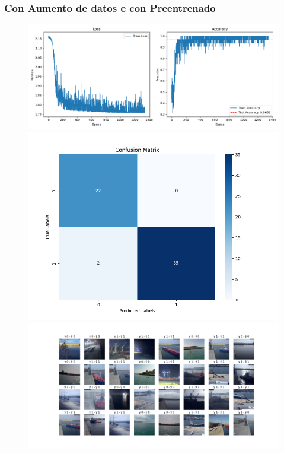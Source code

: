 \documentclass{article}
\begin{document}
\begin{figure}[H]
\begin{minipage}{0.7\textwidth}
    \end{minipage}
\end{figure}
\subsubsection{Con Aumento de datos e con Preentrenado}
\begin{figure}[H]
    \centering
    \begin{minipage}{0.55\textwidth}
        \centering
        \includegraphics[width=\linewidth]{../figures/LOSS__A_True_P_True_D_False_MLP_True_efficientnet_b4.png}
    \end{minipage}
    \begin{minipage}{0.3\textwidth}
        \centering
        \includegraphics[width=\linewidth]{../figures/CM__A_True_P_True_D_False_MLP_True_efficientnet_b4.png}
    \end{minipage}
    \begin{minipage}{0.7\textwidth}
        \centering
        \includegraphics[width=\linewidth]{../figures/GRID__A_True_P_True_D_False_MLP_True_efficientnet_b4.png}

\end{minipage}
\end{figure}
\end{document}
